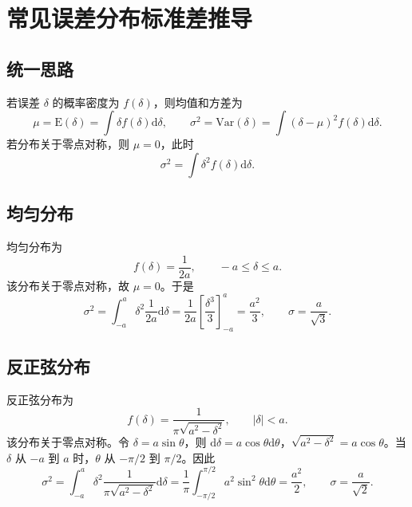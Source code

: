 \documentclass[UTF8,12pt,a4paper]{ctexart}
\newcommand{\dd}{\mathrm{d}}
\newcommand{\E}{\mathrm{E}}
\newcommand{\Var}{\mathrm{Var}}
\newcommand{\abs}[1]{\left|#1\right|}
\begin{document}
\section{常见误差分布标准差推导}

\subsection{统一思路}
若误差 $\delta$ 的概率密度为 $f(\delta)$，则均值和方差为
\begin{equation*}
    \mu=\E(\delta)=\int \delta f(\delta)\dd\delta,
    \qquad
    \sigma^2=\Var(\delta)=\int(\delta-\mu)^2f(\delta)\dd\delta .
\end{equation*}
若分布关于零点对称，则 $\mu=0$，此时
\begin{equation*}
    \sigma^2=\int \delta^2 f(\delta)\dd\delta .
\end{equation*}

\subsection{均匀分布}
均匀分布为
\begin{equation*}
f(\delta)=\frac{1}{2a},\qquad -a\le \delta\le a .
\end{equation*}
该分布关于零点对称，故 $\mu=0$。于是
\begin{equation*}
\sigma^2=\int_{-a}^{a}\delta^2\frac{1}{2a}\dd\delta
=\frac{1}{2a}\left[\frac{\delta^3}{3}\right]_{-a}^{a}
=\frac{a^2}{3},\qquad
\sigma=\frac{a}{\sqrt{3}} .
\end{equation*}

\subsection{反正弦分布}
反正弦分布为
\begin{equation*}
f(\delta)=\frac{1}{\pi\sqrt{a^2-\delta^2}},\qquad \abs{\delta}<a .
\end{equation*}
该分布关于零点对称。令 $\delta=a\sin\theta$，则 $\dd\delta=a\cos\theta\dd\theta$，$\sqrt{a^2-\delta^2}=a\cos\theta$。当 $\delta$ 从 $-a$ 到 $a$ 时，$\theta$ 从 $-\pi/2$ 到 $\pi/2$。因此
\begin{equation*}
\sigma^2=\int_{-a}^{a}\delta^2\frac{1}{\pi\sqrt{a^2-\delta^2}}\dd\delta
=\frac{1}{\pi}\int_{-\pi/2}^{\pi/2}a^2\sin^2\theta\dd\theta
=\frac{a^2}{2},\qquad
\sigma=\frac{a}{\sqrt{2}} .
\end{equation*}
\end{document}
